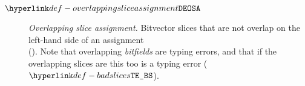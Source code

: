 \begin{description}
\hypertarget{def-overlappingsliceassignment}{}
\item[$\OverlappingSliceAssignment$]
  \textit{Overlapping slice assignment.}
  Bitvector slices that are not \symbolicallyevaluable{} overlap on the left-hand side of an assignment \\
  ().
  Note that overlapping \emph{bitfields} are typing errors, and that if the overlapping slices are \symbolicallyevaluable{} this too is a typing error ($\BadSlices$).
\end{description}
